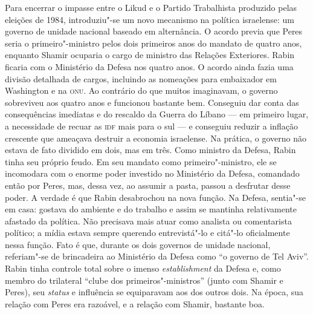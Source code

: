 Para encerrar o impasse entre o Likud e o Partido Trabalhista produzido
pelas eleições de 1984, introduziu"-se um novo mecanismo na política
israelense: um governo de unidade nacional baseado em alternância. O
acordo previa que Peres seria o primeiro"-ministro pelos dois primeiros anos
do mandato de quatro anos, enquanto Shamir ocuparia o cargo de ministro
das Relações Exteriores. Rabin ficaria com o Ministério da Defesa nos
quatro anos. O acordo ainda fazia uma divisão detalhada de cargos,
incluindo as nomeações para embaixador em Washington e na \textsc{onu}. Ao
contrário do que muitos imaginavam, o governo sobreviveu aos quatro anos
e funcionou bastante bem. Conseguiu dar conta das consequências
imediatas e do rescaldo da Guerra do Líbano --- em primeiro lugar, a
necessidade de recuar as \textsc{idf} mais para o sul --- e conseguiu reduzir a
inflação crescente que ameaçava destruir a economia israelense. Na
prática, o governo não estava de fato dividido em dois, mas em três.
Como ministro da Defesa, Rabin tinha seu próprio feudo. Em seu mandato
como primeiro"-ministro, ele se incomodara com o enorme poder investido
no Ministério da Defesa, comandado então por Peres, mas, dessa vez,
ao assumir a pasta, passou a desfrutar desse poder.
A verdade é que Rabin desabrochou na nova função. Na Defesa, sentia"-se
em casa: gostava do ambiente e do trabalho e assim se mantinha
relativamente afastado da política. Não precisava mais atuar como
analista ou comentarista político; a mídia estava sempre querendo
entrevistá"-lo e citá"-lo oficialmente nessa função. Fato é que, durante os
dois governos de unidade nacional, referiam"-se de brincadeira ao
Ministério da Defesa como ``o governo de Tel Aviv''. Rabin tinha
controle total sobre o imenso \textit{establishment} da Defesa e, como
membro do trilateral ``clube dos primeiros"-ministros'' (junto com Shamir
e Peres), seu \textit{status} e influência se equiparavam aos dos outros dois. Na
época, sua relação com Peres era razoável, e a relação com Shamir,
bastante boa.

